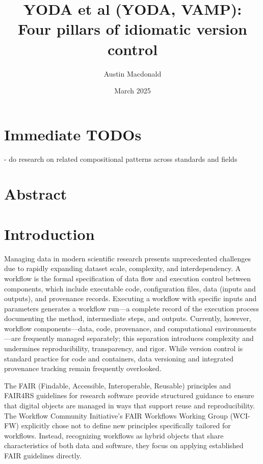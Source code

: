 \documentclass{article}
\title{YODA et al (YODA, VAMP): Four pillars of idiomatic version control}
\author{Austin Macdonald}
\date{March 2025}
\begin{document}
\maketitle

\section{Immediate TODOs}

- do research on related compositional patterns across standards and fields

\section{Abstract}


\section{Introduction}

Managing data in modern scientific research presents unprecedented challenges due to rapidly expanding dataset scale, complexity, and interdependency.
A workflow is the formal specification of data flow and execution control between components, which include executable code, configuration files, data (inputs and outputs), and provenance records.
Executing a workflow with specific inputs and parameters generates a workflow run—a complete record of the execution process documenting the method, intermediate steps, and outputs.
Currently, however, workflow components—data, code, provenance, and computational environments—are frequently managed separately; this separation introduces complexity and undermines reproducibility, transparency, and rigor.
While version control is standard practice for code and containers, data versioning and integrated provenance tracking remain frequently overlooked.

The FAIR (Findable, Accessible, Interoperable, Reusable) principles and FAIR4RS guidelines for research software provide structured guidance to ensure that digital objects are managed in ways that support reuse and reproducibility.
The Workflow Community Initiative’s FAIR Workflows Working Group (WCI-FW) explicitly chose not to define new principles specifically tailored for workflows.
Instead, recognizing workflows as hybrid objects that share characteristics of both data and software, they focus on applying established FAIR guidelines directly.
\end{document}
